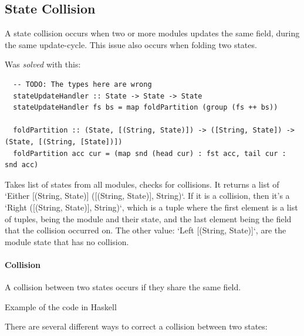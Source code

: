 \subsection{State Collision}

A state collision occurs when two or more modules updates the same field, during
the same update-cycle. This issue also occurs when folding two states.

Was \textit{solved} with this:

\begin{verbatim}
  -- TODO: The types here are wrong
  stateUpdateHandler :: State -> State -> State
  stateUpdateHandler fs bs = map foldPartition (group (fs ++ bs))

  foldPartition :: (State, [(String, State)]) -> ([String, State]) -> (State, [(String, [State])])
  foldPartition acc cur = (map snd (head cur) : fst acc, tail cur : snd acc)
\end{verbatim}

Takes list of states from all modules, checks for collisions. It returns a
list of `Either [(String, State)] ([(String, State)], String)`. If it is a
collision, then it's a `Right ([(String, State)], String)`, which is a tuple
where the first element is a list of tuples, being the module and their
state, and the last element being the field that the collision occurred on.
The other value: `Left [(String, State)]`, are the module state that has no
collision.

\paragraph{Collision} A collision between two states occurs if they share the same
field.

Example of the code in Haskell

\begin{center}
  
\end{center}

There are several different ways to correct a collision between two
states:


